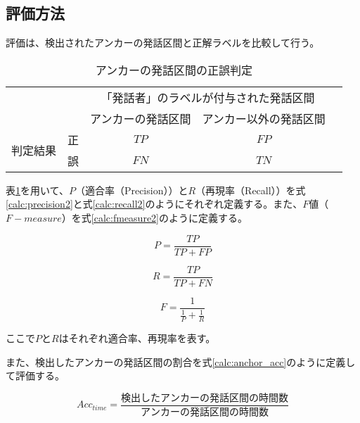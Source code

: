 \subsection{評価方法}
評価は、検出されたアンカーの発話区間と正解ラベルを比較して行う。

\begin{table}[H]
\begin{center}
    \caption{アンカーの発話区間の正誤判定 \label{table:clustering}}
\begin{tabular}{|c|c|c|c|l}
\cline{1-4}
\multicolumn{2}{|c|}{\multirow{2}{*}{}} & \multicolumn{2}{c|}{「発話者」のラベルが付与された発話区間} &  \\ \cline{3-4}
\multicolumn{2}{|c|}{}                  & アンカーの発話区間        & アンカー以外の発話区間        &  \\ \cline{1-4}
\multirow{2}{*}{判定結果}        & 正        & $TP$                  & $FP$                   &  \\ \cline{2-4}
& 誤        & $FN$                  & $TN$                   &  \\ \cline{1-4}
\end{tabular}
\end{center}
\end{table}

表\ref{table:clustering}を用いて、$P$（適合率（Precision））と$R$（再現率（Recall））を式\ref{calc:precision2}と式\ref{calc:recall2}のようにそれぞれ定義する。また、$F$値（$F-measure$）を式\ref{calc:fmeasure2}のように定義する。

\begin{equation}
\label{calc:precision2}
P = \frac{TP}{TP + FP}
\end{equation}

\begin{equation}
\label{calc:recall2}
R = \frac{TP}{TP + FN}
\end{equation}

\begin{equation}
\label{calc:fmeasure2}
F = \frac{1}{\frac{1}{P} + \frac{1}{R}}
\end{equation}

ここで$P$と$R$はそれぞれ適合率、再現率を表す。

また、検出したアンカーの発話区間の割合を式\ref{calc:anchor_acc}のように定義して評価する。

\begin{equation}
\label{calc:anchor_acc}
Acc_{time} = \frac{検出したアンカーの発話区間の時間数}{アンカーの発話区間の時間数}
\end{equation}

